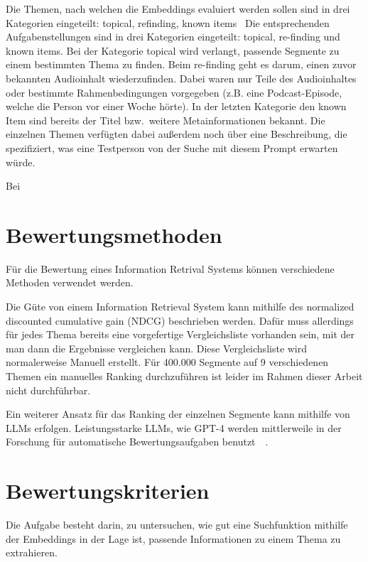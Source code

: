 Die Themen, nach welchen die Embeddings evaluiert werden sollen sind in drei Kategorien eingeteilt:
topical, refinding, known items~\cite{jones2021}
Die entsprechenden Aufgabenstellungen sind in drei Kategorien eingeteilt: topical, re-finding und known items.
Bei der Kategorie topical wird verlangt, passende Segmente zu einem bestimmten Thema zu finden.
Beim re-finding geht es darum, einen zuvor bekannten Audioinhalt wiederzufinden.
Dabei waren nur Teile des Audioinhaltes oder bestimmte Rahmenbedingungen vorgegeben (z.B. eine Podcast-Episode, welche die Person vor einer Woche hörte).
In der letzten Kategorie den known Item sind bereits der Titel bzw.\ weitere Metainformationen bekannt.
Die einzelnen Themen verfügten dabei außerdem noch über eine Beschreibung, die spezifiziert, was eine Testperson von der Suche mit diesem Prompt erwarten würde.


Bei



\section{Bewertungsmethoden}


Für die Bewertung eines Information Retrival Systems können verschiedene Methoden verwendet werden.


Die Güte von einem Information Retrieval System kann mithilfe des normalized discounted cumulative gain (NDCG) beschrieben werden. 
Dafür muss allerdings für jedes Thema bereits eine vorgefertige Vergleichsliste vorhanden sein, mit der man dann die Ergebnisse vergleichen kann.
Diese Vergleichsliste wird normalerweise Manuell erstellt.
Für 400.000 Segmente auf 9 verschiedenen Themen ein manuelles Ranking durchzuführen ist leider im Rahmen dieser Arbeit nicht durchführbar.

Ein weiterer Ansatz für das Ranking der einzelnen Segmente kann mithilfe von LLMs erfolgen.
Leistungsstarke LLMs, wie GPT-4 werden mittlerweile in der Forschung für automatische Bewertungsaufgaben benutzt~\cite{naismith2023}~\cite{nilsson2023}.



\section{Bewertungskriterien}


Die Aufgabe besteht darin, zu untersuchen, wie gut eine Suchfunktion mithilfe der Embeddings in der Lage ist, passende Informationen zu einem Thema zu extrahieren.


